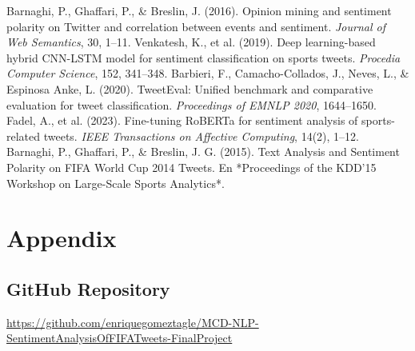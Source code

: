 \documentclass[10pt]{article}
\begin{document}
\begin{thebibliography}{9}
 Barnaghi, P., Ghaffari, P., \& Breslin, J. (2016). Opinion mining and sentiment polarity on Twitter and correlation between events and sentiment. \textit{Journal of Web Semantics}, 30, 1–11.
 Venkatesh, K., et al. (2019). Deep learning-based hybrid CNN-LSTM model for sentiment classification on sports tweets. \textit{Procedia Computer Science}, 152, 341–348.
 Barbieri, F., Camacho-Collados, J., Neves, L., \& Espinosa Anke, L. (2020). TweetEval: Unified benchmark and comparative evaluation for tweet classification. \textit{Proceedings of EMNLP 2020}, 1644–1650.
 Fadel, A., et al. (2023). Fine-tuning RoBERTa for sentiment analysis of sports-related tweets. \textit{IEEE Transactions on Affective Computing}, 14(2), 1–12.
Barnaghi, P., Ghaffari, P., \& Breslin, J. G. (2015). Text Analysis and Sentiment Polarity on FIFA World Cup 2014 Tweets. En *Proceedings of the KDD’15 Workshop on Large-Scale Sports Analytics*.  
\end{thebibliography}
\section{Appendix}
\subsection{GitHub Repository}
\url{https://github.com/enriquegomeztagle/MCD-NLP-SentimentAnalysisOfFIFATweets-FinalProject}
\end{document}
